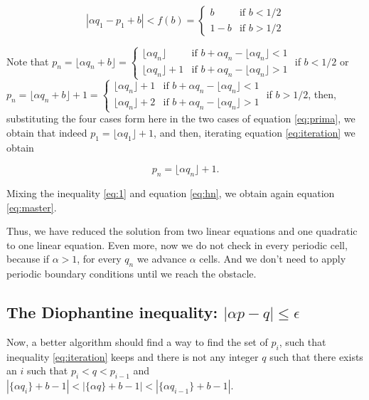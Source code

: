 \documentclass[prl,amsmath,amssymb, twocolumn, showpacs]{revtex4-1}
\begin{document}
\begin{equation}
|\alpha q_1 -p_1 + b|< f(b) = \begin{cases} b &\mbox{if } b < 1/2 \\ 
1-b & \mbox{if } b > 1/2 \end{cases} 
\label{eq:prima}
\end{equation}

Note that $p_n= \lfloor \alpha q_n +b  \rfloor= \begin{cases} \lfloor \alpha q_n  \rfloor  &\mbox{if } b+\alpha q_n-\lfloor \alpha q_n  \rfloor < 1 \\ 
 \lfloor \alpha q_n  \rfloor+1  &\mbox{if } b+\alpha q_n-\lfloor \alpha q_n  \rfloor > 1 \end{cases}$ if $b<1/2$ or $p_n= \lfloor \alpha q_n +b  \rfloor+1= \begin{cases} \lfloor \alpha q_n  \rfloor+1  &\mbox{if } b+\alpha q_n-\lfloor \alpha q_n  \rfloor < 1 \\ 
 \lfloor \alpha q_n  \rfloor+2  &\mbox{if } b+\alpha q_n-\lfloor \alpha q_n  \rfloor > 1 \end{cases}$ if $b>1/2$, then, substituting the four cases form here in the two cases of equation \ref{eq:prima}, we obtain that indeed $p_1= \lfloor \alpha q_1  \rfloor+1$, and then,  iterating  equation \ref{eq:iteration} we obtain 

\begin{equation}
 p_n= \lfloor \alpha q_n  \rfloor+1.
\label{eq:hn}
\end{equation}
 
Mixing the inequality \ref{eq:1} and equation \ref{eq:hn}, we obtain again equation \ref{eq:master}. 

Thus, we have reduced the solution from two linear equations and one quadratic to one linear equation. Even more, now we do not check in every periodic cell, because if $\alpha >1$, for every $q_n$ we advance $\alpha$ cells. And we don't need to apply periodic boundary conditions until we reach the obstacle. 

\subsection{The Diophantine inequality: $|\alpha p - q|\leq \epsilon$}

Now, a better algorithm should find a way to find the set of $p_i$, such that inequality \ref{eq:iteration} keeps and there is not any integer $q$ such that there exists an $i$ such that $p_i<q<p_{i-1}$ and
$|\{ \alpha  q_i \}+b -1|<|\{ \alpha  q \}+b -1| <|\{ \alpha  q_{i-1} \}+b -1|$. 
\end{document}
